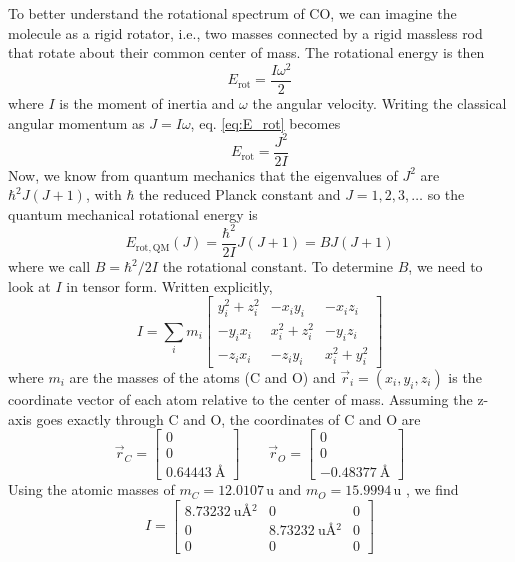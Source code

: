 \documentclass[a4paper,10pt]{scrartcl}
\begin{document}
To better understand the rotational spectrum of CO, we can imagine the molecule as a rigid rotator, i.e., two masses connected by a rigid massless rod that rotate about their common center of mass. The rotational energy is then
\begin{equation}\label{eq:E_rot}
E_\mathrm{rot} = \frac{I \omega^2}{2}
\end{equation}
where $I$ is the moment of inertia and $\omega$ the angular velocity. Writing the classical angular momentum as $J=I \omega$, eq. \eqref{eq:E_rot} becomes
\begin{equation}
E_\mathrm{rot} = \frac{J^2}{2I}
\end{equation}
Now, we know from quantum mechanics that the eigenvalues of $J^2$ are $\hbar^2 J (J+1)$, with $\hbar$ the reduced Planck constant and $J=1,2,3, \dots$ so the quantum mechanical rotational energy is
\begin{equation}
E_\mathrm{rot, QM}(J) = \frac{\hbar^2}{2I}J(J+1) = BJ(J+1)
\end{equation}
where we call $B=\hbar^2/2I$ the rotational constant. To determine $B$, we need to look at $I$ in tensor form. Written explicitly,
\begin{equation}
I = \sum_i m_i \begin{bmatrix}
y_i^2 + z_i^2 & -x_i y_i & -x_i z_i \\ 
-y_i x_i & x_i^2+z_i^2 & -y_i z_i \\ 
-z_i x_i & -z_i y_i & x_i^2+y_i^2
\end{bmatrix} 
\end{equation}
where $m_i$ are the masses of the atoms (C and O) and $\vec{r}_i = (x_i, y_i, z_i)$ is the coordinate vector of each atom relative to the center of mass. Assuming the z-axis goes exactly through C and O, the coordinates of C and O are \cite{nist1}
\[
\vec{r}_C = \begin{bmatrix}
0 \\ 
0 \\ 
\SI{0.64443}{\angstrom}
\end{bmatrix} \qquad \vec{r}_O = \begin{bmatrix}
0 \\ 
0 \\ 
\SI{-0.48377}{\angstrom}
\end{bmatrix}
\]
Using the atomic masses of $m_C = 12.0107\, \mathrm{u}$ and $m_O=15.9994\, \mathrm{u}$ \cite{nist1}, we find
\[ 
I =  \begin{bmatrix}
\SI{8.73232}{\amu\angstrom^2} 	& 0 		& 0 \\ 
0 		& \SI{8.73232}{\amu\angstrom^2} 	& 0 \\ 
0 		& 0		& 0
\end{bmatrix} 
\]
\end{document}
